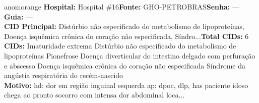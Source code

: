 \documentclass[a4paper,10pt]{article}
\begin{document}
\begin{anomalycard}[Interna\c{c}\~{a}o \#167979 | Pac. \#94816 | ALTO (z=3.00) | LOS: 15d | 08/03/2026\,$\to$\,—]{anomorange}
\textbf{Hospital:} Hospital \#16\quad \textbf{Fonte:} GHO-PETROBRAS\quad \textbf{Senha:} ---\quad \textbf{Guia:} ---\\

\textbf{CID Principal:} {\small Distúrbio não especificado do metabolismo de lipoproteínas, Doença isquêmica crônica do coração não especificada, Síndro...}\quad\textbf{Total CIDs:} 6\\

\textbf{CIDs:} {\scriptsize Imaturidade extrema \textbar{} Distúrbio não especificado do metabolismo de lipoproteínas \textbar{} Pionefrose \textbar{} Doença diverticular do intestino delgado com perfuração e abscesso \textbar{} Doença isquêmica crônica do coração não especificada \textbar{} Síndrome da angústia respiratória do recém-nascido}\\

\textbf{Motivo:} {\scriptsize hd: dor em região inguinal esquerda  ap: dpoc, dlp, has  paciente idoso chega ao pronto socorro com intensa dor abdominal loca...}\\




\end{anomalycard}
\end{document}
